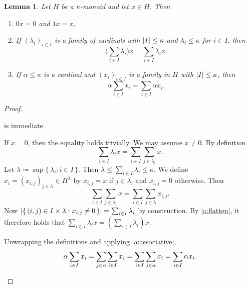 \documentclass[a4paper,11pt,oneside]{amsart}
\newtheorem{lemma}[teor]{Lemma}
\theoremstyle{remark}
\DeclarePairedDelimiter{\card}{\lvert}{\rvert}
\begin{document}
\begin{lemma} \label{l:kappa-rules}
  Let $H$ be a $\kappa$-monoid and let $x \in H$. Then
  \begin{enumerate}
  \item \label{kappa-rules:trivial} $0 x = 0$ and $1x=x$,
  \item \label{kappa-rules:distr1} If $(\lambda_i)_{i \in I}$ is a family of cardinals with $\card{I} \leq  \kappa$ and $\lambda_i \leq  \kappa$ for $i \in I$, then
    \[
      \Big(\sum_{i \in I} \lambda_i\Big) x = \sum_{i \in I} \lambda_i x.
    \]
  \item \label{kappa-rules:distr2} If $\alpha \le \kappa$ is a cardinal and $(x_i)_{i \in I}$ is a family in $H$ with $\card{I} \le \kappa$, then
    \[
      \alpha \sum_{i \in I} x_i = \sum_{i \in I} \alpha x_i.
    \]
  \end{enumerate}
\end{lemma}

\begin{proof}
  \begin{proofenumerate}
  \item[\ref{kappa-rules:trivial}] is immediate.

  \item[\ref{kappa-rules:distr1}]
  If $x=0$, then the equality holds trivially. We may assume $x\ne 0$.
  By definition
  \[
    \sum_{i \in I} \lambda_i x = \sum_{i \in I} \sum_{j \in \lambda_i} x.
  \]
  Let $\lambda \coloneqq \sup\{\, \lambda_i : i \in I \,\}$.
  Then $\lambda \le \sum_{i \in I} \lambda_i \le \kappa$.
  We define $x_i=(x_{i,j})_{j \in \lambda} \in H^\lambda$ by $x_{i,j} = x$ if $j \in \lambda_i$ and $x_{i,j}=0$ otherwise.
  Then
  \[
    \sum_{i \in I} \sum_{j \in \lambda_i} x = \sum_{i \in I} \sum_{j \in \lambda} x_{i,j}.
  \]
  Now $\card{ \{\, (i,j) \in I \times \lambda : x_{i,j} \ne 0 \,\}} = \sum_{i \in I} \lambda_i$ by construction.
  By \ref{a:flatten}, it therefore holds that $\sum_{i \in I} \lambda_i x = (\sum_{i \in I} \lambda_i) x$.

  \item[\ref{kappa-rules:distr2}]
  Unwrapping the definitions and applying \ref{a:associative},
  \[
    \begin{split}
      \alpha \sum_{i \in I} x_i = \sum_{j \in \alpha} \sum_{i \in I} x_i = \sum_{i \in I} \sum_{j \in \alpha} x_i = \sum_{i \in I} \alpha x_i. \qedhere
    \end{split}
  \]
  \end{proofenumerate}
\end{proof}
\end{document}
